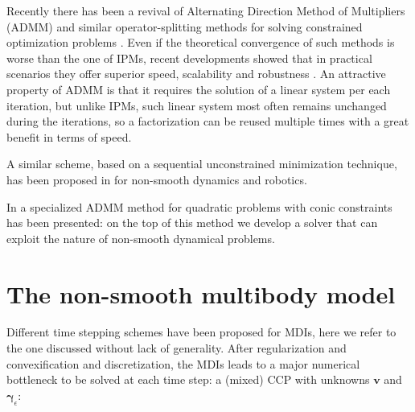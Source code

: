 \documentclass{svproc}
\newcommand{\vect}[1]{\bm{#1}}
\begin{document}
Recently there has been a revival of Alternating Direction Method of Multipliers (ADMM) and similar operator-splitting methods for solving constrained optimization problems
\cite{Goldstein2014}. %
Even if the theoretical convergence of such methods is worse than the one of IPMs, recent developments showed that in practical scenarios they offer superior speed, scalability and robustness 
\cite{Cannon2019}. %
An attractive property of ADMM is that it requires the solution of a linear system per each iteration, but unlike IPMs, such linear system most often remains unchanged during the iterations, so a factorization can be reused multiple times with a great benefit in terms of speed.

A similar scheme, based on a sequential unconstrained minimization technique, has been proposed in \cite{Yunt2006} for non-smooth dynamics and robotics.

In 
\cite{Stellato2020} %
a specialized ADMM method for quadratic problems with conic constraints has been presented: on the top of this method we develop a solver that can exploit the nature of non-smooth dynamical problems. 




\section{The non-smooth multibody model}

Different time stepping schemes have been proposed for MDIs, here we refer to the one discussed \cite{TasoraAnitescuCMAME10} without lack of generality. After regularization and convexification and discretization, the MDIs leads to a major numerical bottleneck to be solved at each time step: a (mixed) CCP with unknowns $\vect{v}$ and $\vect{\gamma}_\epsilon$: 
\end{document}
